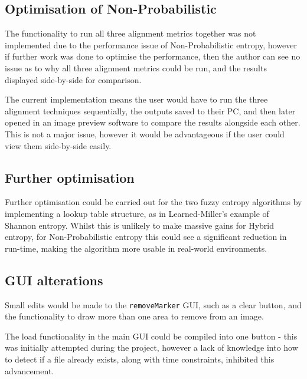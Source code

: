 \subsection{Optimisation of Non-Probabilistic}

The functionality to run all three alignment metrics together was not implemented due to the performance issue of Non-Probabilistic entropy, however if further work was done to optimise the performance, then the author can see no issue as to why all three alignment metrics could be run, and the results displayed side-by-side for comparison.

The current implementation means the user would have to run the three alignment techniques sequentially, the outputs saved to their PC, and then later opened in an image preview software to compare the results alongside each other. This is not a major issue, however it would be advantageous if the user could view them side-by-side easily.

\subsection{Further optimisation}

Further optimisation could be carried out for the two fuzzy entropy algorithms by implementing a lookup table structure, as in Learned-Miller's example of Shannon entropy. Whilst this is unlikely to make massive gains for Hybrid entropy, for Non-Probabilistic entropy this could see a significant reduction in run-time, making the algorithm more usable in real-world environments.

\subsection{GUI alterations}

Small edits would be made to the \texttt{removeMarker} \acrshort{GUI}, such as a clear button, and the functionality to draw more than one area to remove from an image.

The load functionality in the main \acrshort{GUI} could be compiled into one button - this was initially attempted during the project, however a lack of knowledge into how to detect if a file already exists, along with time constraints, inhibited this advancement.
